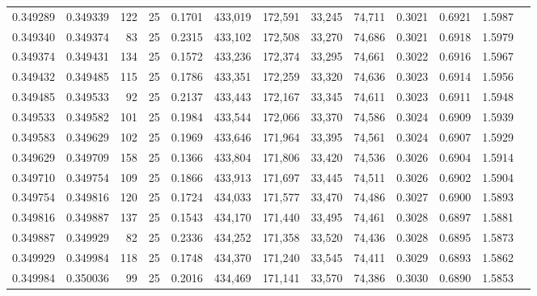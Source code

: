 \begin{tabular}{rrrrrrrrrrrrr}
0.349289 & 0.349339 &   122 &  25 &                                     0.1701 & 433,019 & 172,591 &  33,245 &  74,711 & 0.3021 & 0.6921 & 1.5987 \\
0.349340 & 0.349374 &    83 &  25 &                                     0.2315 & 433,102 & 172,508 &  33,270 &  74,686 & 0.3021 & 0.6918 & 1.5979 \\
0.349374 & 0.349431 &   134 &  25 &                                     0.1572 & 433,236 & 172,374 &  33,295 &  74,661 & 0.3022 & 0.6916 & 1.5967 \\
0.349432 & 0.349485 &   115 &  25 &                                     0.1786 & 433,351 & 172,259 &  33,320 &  74,636 & 0.3023 & 0.6914 & 1.5956 \\
0.349485 & 0.349533 &    92 &  25 &                                     0.2137 & 433,443 & 172,167 &  33,345 &  74,611 & 0.3023 & 0.6911 & 1.5948 \\
0.349533 & 0.349582 &   101 &  25 &                                     0.1984 & 433,544 & 172,066 &  33,370 &  74,586 & 0.3024 & 0.6909 & 1.5939 \\
0.349583 & 0.349629 &   102 &  25 &                                     0.1969 & 433,646 & 171,964 &  33,395 &  74,561 & 0.3024 & 0.6907 & 1.5929 \\
0.349629 & 0.349709 &   158 &  25 &                                     0.1366 & 433,804 & 171,806 &  33,420 &  74,536 & 0.3026 & 0.6904 & 1.5914 \\
0.349710 & 0.349754 &   109 &  25 &                                     0.1866 & 433,913 & 171,697 &  33,445 &  74,511 & 0.3026 & 0.6902 & 1.5904 \\
0.349754 & 0.349816 &   120 &  25 &                                     0.1724 & 434,033 & 171,577 &  33,470 &  74,486 & 0.3027 & 0.6900 & 1.5893 \\
0.349816 & 0.349887 &   137 &  25 &                                     0.1543 & 434,170 & 171,440 &  33,495 &  74,461 & 0.3028 & 0.6897 & 1.5881 \\
0.349887 & 0.349929 &    82 &  25 &                                     0.2336 & 434,252 & 171,358 &  33,520 &  74,436 & 0.3028 & 0.6895 & 1.5873 \\
0.349929 & 0.349984 &   118 &  25 &                                     0.1748 & 434,370 & 171,240 &  33,545 &  74,411 & 0.3029 & 0.6893 & 1.5862 \\
0.349984 & 0.350036 &    99 &  25 &                                     0.2016 & 434,469 & 171,141 &  33,570 &  74,386 & 0.3030 & 0.6890 & 1.5853 \\

\end{tabular}

